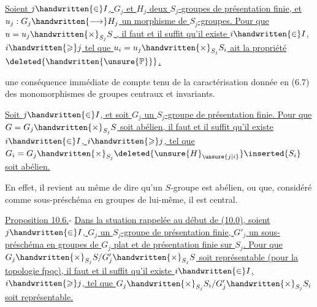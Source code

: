 




 \uline{Soient $j\handwritten{\in}I$, $G_j$ et $H_j$ deux $S_j$-groupes de présentation finie, et $u_j:G_j\handwritten{\longrightarrow}H_j$ un morphisme de $S_j$-groupes. Pour que $u=u_j\handwritten{\times}_{S_j}S$  }\uline{, il faut et il suffit qu'il existe $i\handwritten{\in}I$, $i\handwritten{\geqslant}j$ tel que $u_i=u_j\handwritten{\times}_{S_j}S_i$ ait la propriété $\deleted{\handwritten{\unsure{\mathbb{P}}}}$.}

 une conséquence immédiate de  compte tenu de la caractérisation donnée en (6.7) des monomorphismes de groupes centraux et invariants.

  \uline{Soit $j\handwritten{\in}I$, et soit $G_j$ un $S_j$-groupe de présentation finie. Pour que $G=G_j\handwritten{\times}_{S_j}S$ soit abélien, il faut et il suffit qu'il existe $i\handwritten{\in}I$, $i\handwritten{\geqslant}j$, tel que $G_i=G_j\handwritten{\times}_{S_j}\deleted{\unsure{H}_{\unsure{j|i}}}\inserted{S_i}$ soit abélien.}

En effet, il revient au même de dire qu'un $S$-groupe est abélien, ou que, considéré comme sous-préschéma en groupes de lui-même, il est central.

\uline{Proposition 10.6.}- \uline{Dans la stuation rappelée au début de (10.0), soient $j\handwritten{\in}I$, $G_j$ un $S_j$-groupe de présentation finie, $G'_j$ un sous-préschéma en groupes de $G_j$ plat et de présentation finie sur $S_j$. Pour que $G_j\handwritten{\times}_{S_j}S/G'_j\handwritten{\times}_{S_j}S$ soit représentable (pour la topologie fpqc), il faut et il suffit qu'il existe $i\handwritten{\in}I$, $i\handwritten{\geqslant}j$, tel que $G_j\handwritten{\times}_{S_j}S_i/G'_j\handwritten{\times}_{S_j}S_i$ soit représentable.}

